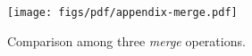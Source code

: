 \begin{figure}
\begin{center}
   \texttt{[image: figs/pdf/appendix-merge.pdf]}
\end{center}
   \caption{
    Comparison among three \textit{merge} operations.
   }
\label{fig:merge}
\end{figure}
